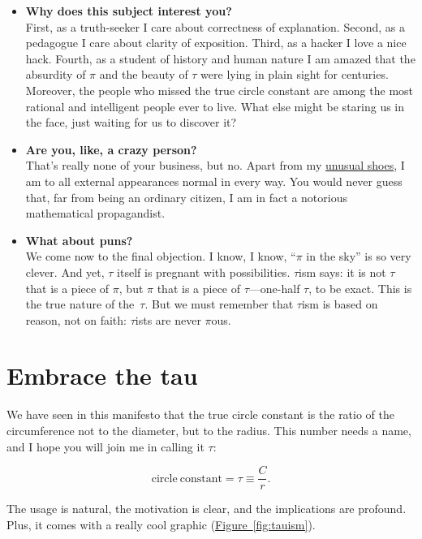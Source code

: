 \documentclass{article}
\begin{document}
\begin{itemize}
  \item \textbf{Why does this subject interest you?} \\ First, as a truth-seeker I care about correctness of explanation. Second, as a pedagogue I care about clarity of exposition. Third, as a hacker I love a nice hack. Fourth, as a student of history and human nature I am amazed that the absurdity of $\pi$ and the beauty of $\tau$ were lying in plain sight for centuries. Moreover, the people who missed the true circle constant are among the most rational and intelligent people ever to live. What else might be staring us in the face, just waiting for us to discover it?
  
  \item \textbf{Are you, like, a crazy person?} \\ That's really none of your business, but no. Apart from my \href{http://www.vibramfivefingers.com/}{unusual shoes}, I am to all external appearances normal in every way. You would never guess that, far from being an ordinary citizen, I am in fact a notorious mathematical propagandist.
  
  \item \textbf{What about puns?} \\ We come now to the final objection. I know, I know, ``$\pi$ in the sky'' is so very clever. And yet, $\tau$ itself is pregnant with possibilities. $\tau$ism says: it is not $\tau$ that is a piece of $\pi$, but $\pi$ that is a piece of $\tau$---one-half $\tau$, to be exact. This is the true nature of the~$\tau$. But we must remember that $\tau$ism is based on reason, not on faith: $\tau$ists are never $\pi$ous.

\end{itemize}


\section{Embrace the tau}

We have seen in this manifesto that the true circle constant is the ratio of the circumference not to the diameter, but to the radius. This number needs a name, and I hope you will join me in calling it $\tau$:

\[
  \mathrm{circle\ constant} = \tau \equiv \frac{C}{r}.
\]

\noindent The usage is natural, the motivation is clear, and the implications are profound. Plus, it comes with a really cool graphic (\hyperref[fig:tauism]{Figure~}\ref{fig:tauism}).
\end{document}
